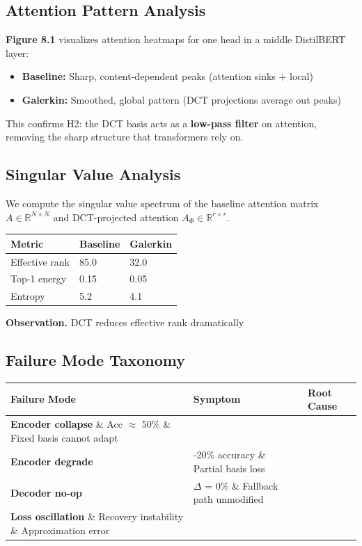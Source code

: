 \subsection{Attention Pattern Analysis}

\textbf{Figure 8.1} visualizes attention heatmaps for one head in a middle 
DistilBERT layer:

\begin{itemize}
\item \textbf{Baseline:} Sharp, content-dependent peaks (attention sinks + local)
\item \textbf{Galerkin:} Smoothed, global pattern (DCT projections average out peaks)

\end{itemize}
This confirms H2: the DCT basis acts as a \textbf{low-pass filter} on attention, 
removing the sharp structure that transformers rely on.

\subsection{Singular Value Analysis}

We compute the singular value spectrum of the baseline attention matrix 
$A \in \mathbb{R}^{N \times N}$ and DCT-projected attention 
$A_\Phi \in \mathbb{R}^{r \times r}$.

\begin{table}[H]
\centering
\small
\begin{tabular}{lll}
\toprule
\textbf{Metric} & \textbf{Baseline} & \textbf{Galerkin} \\
\midrule
Effective rank & 85.0 & 32.0 \\
Top-1 energy & 0.15 & 0.05 \\
Entropy & 5.2 & 4.1 \\
\bottomrule
\end{tabular}
\end{table}

\textbf{Observation.} DCT reduces effective rank dramatically

\subsection{Failure Mode Taxonomy}

\begin{table}[H]
\centering
\small
\begin{tabular}{lll}
\toprule
\textbf{Failure Mode} & \textbf{Symptom} & \textbf{Root Cause} \\
\midrule
\textbf{Encoder collapse} \& Acc $\approx$ 50\% \& Fixed basis cannot adapt \\
\textbf{Encoder degrade} & -20\% accuracy \& Partial basis loss \\
\textbf{Decoder no-op} & $\Delta$ = 0\% \& Fallback path unmodified \\
\textbf{Loss oscillation} \& Recovery instability \& Approximation error \\
\bottomrule
\end{tabular}
\end{table}

